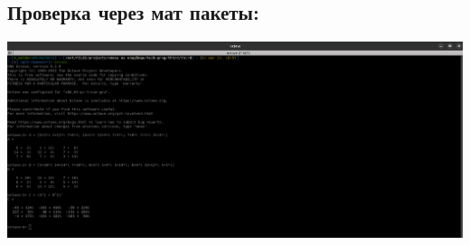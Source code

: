 \documentclass[a4paper]{article}
\begin{document}
\subsection{Проверка через мат пакеты:}
\includegraphics[width=1\textwidth]{check.png}
\end{document}
